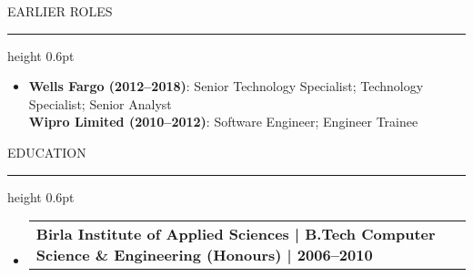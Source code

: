 \documentclass[letterpaper,10pt]{article}
\makeatletter
\newcommand{\subheadingtitlevspace}{\vspace{-3pt}}
\newcommand{\titleItem}[1]{\textbf{#1}}
\newcommand{\resumeProjectHeading}[2]{\item\begin{tabular*}{0.97\textwidth}{l@{\extracolsep{\fill}}r}#1 & \textit{ #2} \\\end{tabular*}\vspace{-6pt}}
\newcommand{\resumeSubHeadingListStart}{\subheadingtitlevspace\begin{itemize}[leftmargin=0.15in, label={}]}
\newcommand{\resumeSubHeadingListEnd}{\end{itemize}}
\newcommand{\ResumeSection}[1]{\par{\fontsize{11pt}{13pt}\selectfont \MakeUppercase{#1}}\vspace{1pt}\hrule height 0.6pt}
\newcommand{\SectionContentGap}{}
\makeatother
\begin{document}
\ResumeSection{Earlier Roles}\vspace{-4pt}
\begin{itemize}[leftmargin=0.15in, label={}]
\item{\titleItem{Wells Fargo (2012--2018)}{: Senior Technology Specialist; Technology Specialist; Senior Analyst} \\[-2pt]
        \titleItem{Wipro Limited (2010--2012)}{: Software Engineer; Engineer Trainee}}
\end{itemize}
\SectionContentGap

\ResumeSection{Education}\vspace{-4pt}
\resumeSubHeadingListStart
\resumeProjectHeading{\titleItem{Birla Institute of Applied Sciences | B.Tech Computer Science \& Engineering (Honours) | 2006--2010}}{}
\resumeSubHeadingListEnd
\end{document}
